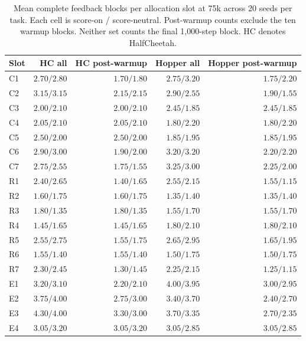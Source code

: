 \begin{table}[!htbp]
\centering\footnotesize
\caption{Mean complete feedback blocks per allocation slot at 75k across 20 seeds per task. Each cell is score-on / score-neutral. Post-warmup counts exclude the ten warmup blocks. Neither set counts the final 1,000-step block. HC denotes HalfCheetah.}
\label{tab:slot_counts}
\begin{tabular}{@{}lrrrr@{}}
\toprule
Slot & HC all & HC post-warmup & Hopper all & Hopper post-warmup \\
\midrule
C1 & $2.70/2.80$ & $1.70/1.80$ & $2.75/3.20$ & $1.75/2.20$ \\
C2 & $3.15/3.15$ & $2.15/2.15$ & $2.90/2.55$ & $1.90/1.55$ \\
C3 & $2.00/2.10$ & $2.00/2.10$ & $2.45/1.85$ & $2.45/1.85$ \\
C4 & $2.05/2.10$ & $2.05/2.10$ & $1.80/2.20$ & $1.80/2.20$ \\
C5 & $2.50/2.00$ & $2.50/2.00$ & $1.85/1.95$ & $1.85/1.95$ \\
C6 & $2.90/3.00$ & $1.90/2.00$ & $3.20/3.20$ & $2.20/2.20$ \\
C7 & $2.75/2.55$ & $1.75/1.55$ & $3.25/3.00$ & $2.25/2.00$ \\
R1 & $2.40/2.65$ & $1.40/1.65$ & $2.55/2.15$ & $1.55/1.15$ \\
R2 & $1.60/1.75$ & $1.60/1.75$ & $1.35/1.40$ & $1.35/1.40$ \\
R3 & $1.80/1.35$ & $1.80/1.35$ & $1.55/1.70$ & $1.55/1.70$ \\
R4 & $1.45/1.65$ & $1.45/1.65$ & $1.80/2.10$ & $1.80/2.10$ \\
R5 & $2.55/2.75$ & $1.55/1.75$ & $2.65/2.95$ & $1.65/1.95$ \\
R6 & $1.55/1.40$ & $1.55/1.40$ & $1.50/1.75$ & $1.50/1.75$ \\
R7 & $2.30/2.45$ & $1.30/1.45$ & $2.25/2.15$ & $1.25/1.15$ \\
E1 & $3.20/3.10$ & $2.20/2.10$ & $4.00/3.95$ & $3.00/2.95$ \\
E2 & $3.75/4.00$ & $2.75/3.00$ & $3.40/3.70$ & $2.40/2.70$ \\
E3 & $4.30/4.00$ & $3.30/3.00$ & $3.70/3.35$ & $2.70/2.35$ \\
E4 & $3.05/3.20$ & $3.05/3.20$ & $3.05/2.85$ & $3.05/2.85$ \\
\bottomrule
\end{tabular}
\end{table}
